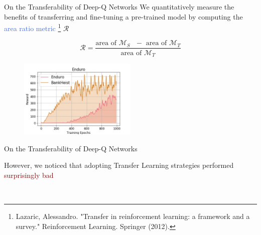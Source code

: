 \documentclass{beamer}
\begin{document}
\begin{frame}{On the Transferability of Deep-Q Networks}
	\bigskip
	We quantitatively measure the benefits of transferring and fine-tuning a pre-trained model by computing the \textcolor{RoyalBlue}{area ratio metric} \footnote{Lazaric, Alessandro. "Transfer in reinforcement learning: a framework and a survey." Reinforcement Learning. Springer (2012).} $\mathscr{R}$

	\begin{equation*}
		\mathscr{R} = \frac{\text{area of $\mathcal{M}_S$ $-$ area of $\mathcal{M}_T$}}{\text{area of $\mathcal{M}_T$}}
	\label{eq:area_ratio_metric}
	\end{equation*}

	\begin{figure}
		\includegraphics[width=0.5\textwidth]{figures/BankHeist_Enduro}
	\end{figure}


\end{frame}

\begin{frame}{On the Transferability of Deep-Q Networks}

	\bigskip

	However, we noticed that adopting Transfer Learning strategies performed \textcolor{Maroon}{surprisingly bad}

	\begin{table}[t!]
	{}
	\label{tab:dqv_res}


        ~\\
	{}
	\label{tab:ddqn_res}
\end{table}

\end{frame}
\end{document}
